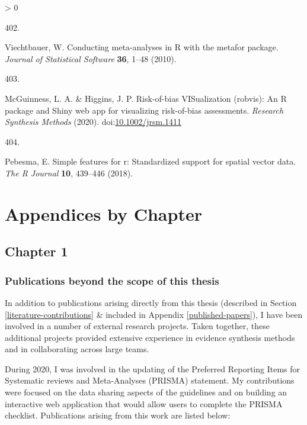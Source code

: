 \documentclass[a4paper, twoside]{templates/ociamthesis}
\newlength{\cslhangindent}
\newlength{\csllabelwidth}
\newenvironment{CSLReferences}[3] %
 {%
  \setlength{\parindent}{0pt}
  \ifodd #1 \everypar{\setlength{\hangindent}{\cslhangindent}}\ignorespaces\fi
  \ifnum #2 > 0
  \setlength{\parskip}{#2\baselineskip}
  \fi
 }%
 {}
\newcommand{\CSLLeftMargin}[1]{\parbox[t]{\maxof{\widthof{#1}}{\csllabelwidth}}{#1}}
\newcommand{\CSLRightInline}[1]{\parbox[t]{\linewidth - \csllabelwidth}{#1}}
\begin{document}
\begin{CSLReferences}{0}{0}
\leavevmode\hypertarget{ref-metafor2010}{}%
\CSLLeftMargin{402. }
\CSLRightInline{Viechtbauer, W. Conducting meta-analyses in {R} with the {metafor} package. \emph{Journal of Statistical Software} \textbf{36}, 1--48 (2010).}

\leavevmode\hypertarget{ref-robvis2020}{}%
\CSLLeftMargin{403. }
\CSLRightInline{McGuinness, L. A. \& Higgins, J. P. Risk-of-bias {VISualization} (robvis): An {R} package and {Shiny} web app for visualizing risk-of-bias assessments. \emph{Research Synthesis Methods} (2020). doi:\href{https://doi.org/10.1002/jrsm.1411}{10.1002/jrsm.1411}}

\leavevmode\hypertarget{ref-sf2018}{}%
\CSLLeftMargin{404. }
\CSLRightInline{Pebesma, E. Simple features for r: Standardized support for spatial vector data. \emph{The R Journal} \textbf{10}, 439--446 (2018).}

\end{CSLReferences}

\startappendices

\hypertarget{chapter-appendix-heading}{%
\chapter{Appendices by Chapter}\label{chapter-appendix-heading}}

\minitoc 

\newpage

\hypertarget{appendix-into}{%
\section{Chapter 1}\label{appendix-into}}

\hypertarget{appendix-publications}{%
\subsection{Publications beyond the scope of this thesis}\label{appendix-publications}}

In addition to publications arising directly from this thesis (described in Section \ref{literature-contributions} \& included in Appendix \ref{published-papers}), I have been involved in a number of external research projects. Taken together, these additional projects provided extensive experience in evidence synthesis methods and in collaborating across large teams.

During 2020, I was involved in the updating of the Preferred Reporting Items for Systematic reviews and Meta-Analyses (PRISMA) statement. My contributions were focused on the data sharing aspects of the guidelines and on building an interactive web application that would allow users to complete the PRISMA checklist. Publications arising from this work are listed below:
\end{document}
